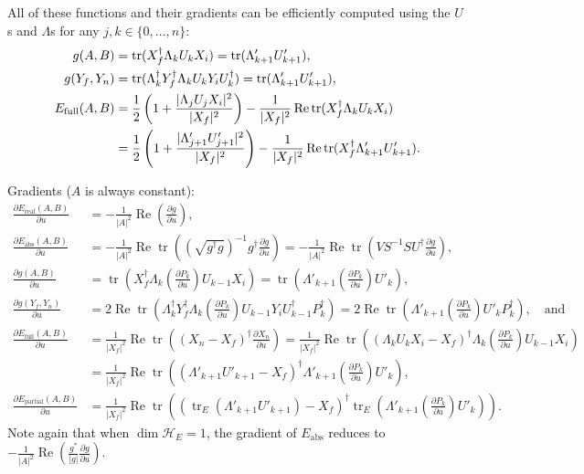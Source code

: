 \documentclass[aps, pra, a4paper, longbibliography, superscriptaddress]{revtex4-1}
\newcommand{\hilb}[1]{\mathcal{#1}}
\DeclareMathOperator{\tr}{tr}
\DeclareMathOperator{\re}{Re}
\newcommand{\dd}[2]{\frac{\partial #1}{\partial #2}}
\begin{document}
All of these functions and their gradients can be efficiently computed
using the $U$s and $\Lambda$s
for any $j, k \in \{0, \ldots, n\}$:
\begin{align}
g(A, B) &= \tr(X_f^\dagger \Lambda_k U_k X_i)
= \tr(\Lambda'_{k+1} U'_{k+1}),\\
g(Y_f, Y_n) &= \tr(\Lambda_k^\dagger Y_f^\dagger \Lambda_k U_k Y_i U_k^\dagger)
= \tr(\Lambda'_{k+1} U'_{k+1}),\\
\notag
E_\text{full}(A, B) &= \frac{1}{2}\left(1 +\frac{|\Lambda_j U_j X_i|^2}{|X_f|^2}\right) -\frac{1}{|X_f|^2} \re \tr(X_f^\dagger \Lambda_k U_k X_i)\\
&= \frac{1}{2}\left(1 +\frac{|\Lambda'_{j+1} U'_{j+1}|^2}{|X_f|^2}\right) -\frac{1}{|X_f|^2} \re \tr(X_f^\dagger \Lambda'_{k+1} U'_{k+1}).
\end{align}


Gradients ($A$ is always constant):
\begin{align}
\dd{E_\text{real}(A,B)}{u}
&= -\frac{1}{|A|^2} \re \left( \dd{g}{u} \right),\\
\dd{E_\text{abs}(A,B)}{u}
&= -\frac{1}{|A|^2} \re \tr \left(\left(\sqrt{g^\dagger g}\right)^{-1} g^\dagger \dd{g}{u}\right)
= -\frac{1}{|A|^2} \re \tr \left(V S^{-1} S U^\dagger \dd{g}{u}\right),\\
\dd{g(A, B)}{u} &= \tr(X_f^\dagger \Lambda_{k} \left(\dd{P_k}{u}\right) U_{k-1} X_i)
= \tr(\Lambda'_{k+1} \left(\dd{P_k}{u}\right) U'_{k}),\\
\dd{g(Y_f, Y_n)}{u} &= 2 \re \tr\left(\Lambda_k^\dagger Y_f^\dagger \Lambda_k \left(\dd{P_k}{u}\right) U_{k-1} Y_i U_{k-1}^\dagger P_k^\dagger \right)
= 2 \re \tr\left(\Lambda'_{k+1} \left(\dd{P_k}{u}\right) U'_{k} P_k^\dagger \right), \quad \text{and}\\
\dd{E_\text{full}(A, B)}{u}
&= \frac{1}{|X_f|^2} \re \tr\left((X_n-X_f)^\dagger \dd{X_n}{u}\right)
= \frac{1}{|X_f|^2} \re \tr\left((\Lambda_k U_k X_i -X_f)^\dagger  \Lambda_{k} \left(\dd{P_k}{u}\right) U_{k-1} X_i \right)\\
&= \frac{1}{|X_f|^2} \re \tr\left((\Lambda'_{k+1} U'_{k+1} -X_f)^\dagger  \Lambda'_{k+1} \left(\dd{P_k}{u}\right) U'_{k} \right),\\
\dd{E_\text{partial}(A, B)}{u}
&= \frac{1}{|X_f|^2} \re \tr\left((\tr_E(\Lambda'_{k+1} U'_{k+1}) -X_f)^\dagger  \tr_E(\Lambda'_{k+1} \left(\dd{P_k}{u}\right) U'_{k}) \right).
\end{align}
Note again that when $\dim \hilb{H}_E = 1$, the gradient of $E_\text{abs}$
reduces to
$-\frac{1}{|A|^2} \re \left(\frac{g^*}{|g|} \dd{g}{u} \right)$.
\end{document}
